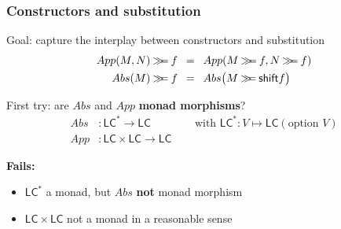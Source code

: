 \documentclass[
serif,
mathsans,
]
{beamer}
\newcommand{\constfont}[1]{\ensuremath{\mathsf{#1}}}
\newcommand{\bind}[2]{{#1}\mathbin{\gg\hspace{-.8ex}=}{#2}}
\newcommand{\shift}{\constfont{shift}}
\newcommand{\LC}{\mathsf{LC}}
\begin{document}
\begin{frame}
 \frametitle{Constructors and substitution}
  \begin{block}{Goal: capture the interplay between constructors and substitution}
  \vspace{-1.5em}
    \begin{align*}
\bind{App(M,N)}{f} \enspace &= \enspace App(\bind{M}{f},\bind{N}{f}) \\
\bind{Abs(M)}{f} \enspace &= \enspace Abs \bigl(\bind{M}{\shift{f}}\bigr)
    \end{align*}
  \vspace{-1.5em}
  \end{block}
  
 \begin{block}{First try: are $Abs$ and $App$  \textbf{monad morphisms}?}
  \vspace{-1.5em}
       \begin{align*}
                    Abs &: \LC^* \to \LC \qquad\qquad \text{with } \LC^*:V \mapsto \LC(\text{option }V) \\
                    App &: \LC \times \LC  \to \LC
       \end{align*}
\vspace{-1.5em}

\textbf{Fails:} 
   \begin{itemize} 
      \item $\LC^*$ a monad, but $Abs$ \textbf{not}  monad morphism 
      \item $\LC \times \LC$ not a monad in a reasonable sense
   \end{itemize}

  \end{block}



 
\end{frame}
\end{document}
